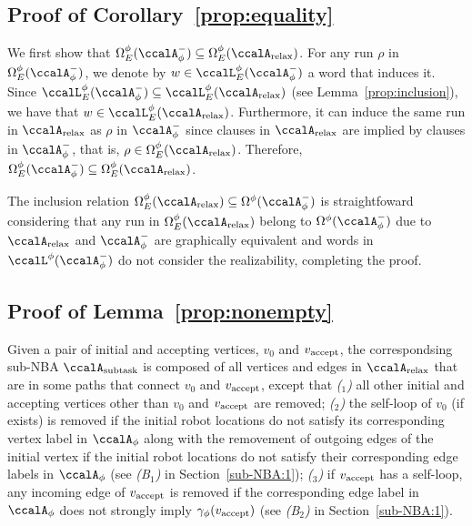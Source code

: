 \documentclass[Afour,sageh,times]{sagej}
\newcounter{mycounter}
\newcommand{\auto}[1]{\ccalA_{\textup{#1}}}
\newcommand{\autop}{\ccalA_{\phi}}
\newcommand{\vertex}[1]{v_{\textup{#1}}}
\begin{document}
{{\subsection{Proof of Corollary~\ref{prop:equality}} \label{app:equality}
 We first show that  $\Omega_E^\phi(\autop^-) \subseteq  \Omega_E^\phi(\auto{relax})$. For any run $\rho$ in $\Omega_E^\phi(\autop^-)$, we denote by $w  \in  \ccalL^\phi_E(\autop^-)$ a word that induces it.  Since $\ccalL^\phi_E(\autop^-) \subseteq \ccalL^\phi_E(\auto{relax})$ (see Lemma~\ref{prop:inclusion}), we have that $w \in\ccalL^\phi_E(\auto{relax})$. Furthermore, it can induce the same run in $\auto{relax}$ as $\rho$  in $\autop^-$ since clauses in $\auto{relax}$ are implied by  clauses in $\autop^-$, that is, $\rho \in \Omega_E^\phi(\auto{relax}) $. Therefore, $\Omega_E^\phi(\autop^-) \subseteq  \Omega_E^\phi(\auto{relax})$.

   The inclusion relation $\Omega_E^\phi(\auto{relax}) \subseteq \Omega^\phi(\autop^-)$ is straightfoward considering that  any  run in  $\Omega_E^\phi(\auto{relax})$  belong to  $\Omega^\phi(\autop^-)$ due to $\auto{relax}$ and $\autop^-$ are graphically equivalent and words in $\ccalL^\phi(\autop^-)$ do not consider the realizability, completing the proof.

   \subsection{Proof of Lemma~\ref{prop:nonempty}}\label{app:nonempty}
Given a pair of initial and accepting vertices, $v_0$ and $\vertex{accept}$, the correspondsing sub-NBA $\auto{subtask}$ is composed of all vertices and edges in $\auto{relax}$ that are in some paths that connect $v_0$ and $\vertex{accept}$, except that {\it ($_1$)} all other initial and accepting vertices other than $v_0$ and $\vertex{accept}$ are removed; {\it ($_2$)} the self-loop of
$v_0$ (if exists) is removed if the initial robot locations do not satisfy its corresponding vertex label in $\autop$ along with the removement of  outgoing edges of the initial vertex if the initial robot locations do not satisfy their corresponding edge labels in $\autop$ (see {\it (B$_1$)} in Section~\ref{sub-NBA:1}); {\it ($_3$)} if $\vertex{accept}$ has a self-loop, any incoming edge of $\vertex{accept}$ is removed if the corresponding edge label in $\autop$ does not strongly  imply $\gamma_{\phi}(\vertex{accept})$ (see {\it (B$_2$)} in Section~\ref{sub-NBA:1}).

}}
\end{document}
